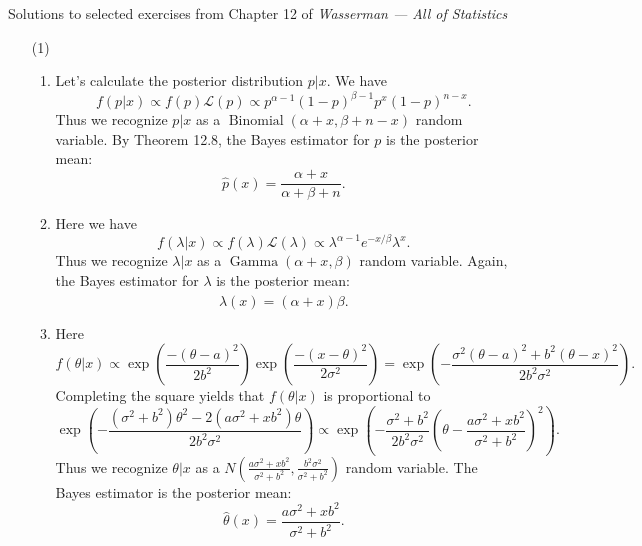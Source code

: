 \documentclass[10pt]{article}
\newcommand{\Beta}{\operatorname{Binomial}}
\newcommand{\Gamm}{\operatorname{Gamma}}
\begin{document}
\noindent \large{Solutions to selected exercises from Chapter 12 of
\emph{Wasserman --- All of Statistics}}

\begin{enumerate}[(1)]
\item[(1)]

\begin{enumerate}
\item Let's calculate the posterior distribution $p|x$. We have
\[
    f(p|x)\propto f(p)\mathcal L(p) \propto p^{\alpha-1}(1-p)^{\beta-1}p^x(1-p)^{n-x}.
\]
Thus we recognize $p|x$ as a $\Beta(\alpha+x,\beta+n-x)$ random variable. By Theorem
12.8, the Bayes estimator for $p$ is the posterior mean:
\[
    \hat p(x) = \frac{\alpha+x}{\alpha+\beta+n}.
\]

\item Here we have
\[
    f(\lambda|x)\propto f(\lambda) \mathcal L(\lambda) \propto
    \lambda^{\alpha-1}e^{-x/\beta}\lambda^x.
\]
Thus we recognize $\lambda|x$ as a $\Gamm(\alpha+x,\beta)$ random variable. Again,
the Bayes estimator for $\lambda$ is the posterior mean:
\[
    \hat \lambda(x)=(\alpha+x)\beta.
\]

\item Here
\[
    f(\theta | x)\propto \exp\left(\frac{-(\theta-a)^2}{2b^2}\right)
    \exp\left(\frac{-(x-\theta)^2}{2\sigma^2}\right)
    = \exp\left(-\frac{\sigma^2(\theta-a)^2+b^2(\theta-x)^2}{2b^2\sigma^2}\right).
\]
Completing the square yields that $f(\theta|x)$ is proportional to
\[
    \exp\left(-\frac{(\sigma^2+b^2)\theta^2-2(a\sigma^2+xb^2)\theta}{2b^2\sigma^2}\right)
    \propto
    \exp\left(-\frac{\sigma^2+b^2}{2b^2\sigma^2}
    \left(\theta - \frac{a\sigma^2+xb^2}{\sigma^2+b^2}\right)^2\right).
\]
Thus we recognize $\theta|x$ as a $N\left(\frac{a\sigma^2+xb^2}{\sigma^2+b^2},
\frac{b^2\sigma^2}{\sigma^2+b^2}\right)$ random variable. The Bayes estimator
is the posterior mean:
\[
    \hat \theta(x) = \frac{a\sigma^2+xb^2}{\sigma^2+b^2}.
\]
\end{enumerate}

\end{enumerate}
\end{document}
